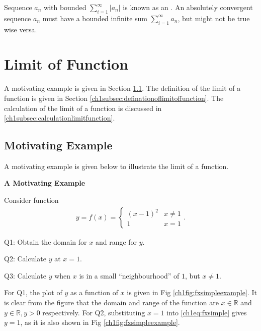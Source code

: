 Sequence $a_n$ with bounded $\sum_{i=1}^{\infty}|a_n|$ is known as an . An absolutely convergent sequence $a_n$ must have a bounded infinite sum $\sum_{i=1}^{\infty}a_n$, but might not be true wise versa.

\section{Limit of Function} \label{ch1sec:limitofafunction}

A motivating example is given in Section \ref{ch1subsec:functionmotivatingexample}. The definition of the limit of a function is given in Section \ref{ch1subsec:definationoflimitoffunction}. The calculation of the limit of a function is discussed in \ref{ch1subsec:calculationlimitfunction}.

\subsection{Motivating Example} \label{ch1subsec:functionmotivatingexample}

A motivating example is given below to illustrate the limit of a function.

\begin{mdframed}
\noindent \textbf{A Motivating Example}

Consider function
\begin{eqnarray}
  y = f(x) = \left\{\begin{array}{cc}
                    (x-1)^2 & x \neq 1 \\
                    1 & x = 1
                  \end{array}\right.. \label{ch1eq:fxsimple}
\end{eqnarray}

Q1: Obtain the domain for $x$ and range for $y$.

Q2: Calculate $y$ at $x = 1$.

Q3: Calculate $y$ when $x$ is in a small ``neighbourhood'' of $1$, but $x \neq 1$.

\end{mdframed}

For Q1, the plot of $y$ as a function of $x$ is given in Fig \ref{ch1fig:fxsimpleexample}. It is clear from the figure that the domain and range of the function are $x\in \mathbb{R}$ and $y\in \mathbb{R}, y > 0$ respectively. For Q2, substituting $x=1$ into \eqref{ch1eq:fxsimple} gives $y=1$, as it is also shown in Fig \ref{ch1fig:fxsimpleexample}.

